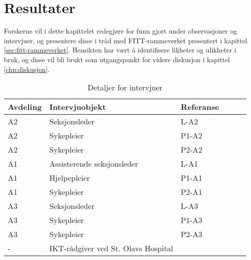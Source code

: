 \chapter{Resultater}
\label{chp:resultater} 

Forskerne vil i dette kapittelet redegjøre for funn gjort under observasjoner og intervjuer, og presentere disse i tråd med FITT-rammeverket presentert i kapittel \ref{sec:fitt-rammeverket}. Hensikten har vært å identifisere likheter og ulikheter i bruk, og disse vil bli brukt som utgangspunkt for videre diskusjon i kapittel \ref{chp:diskusjon}.


\begin{table}[H]\centering
    \begin{tabular}{ |l|l|l|l|l|l| }
    \hline
    Avdeling & Intervjuobjekt & Referanse \\ \hline
       A2 & Seksjonsleder & L-A2 \\ \hline
       A2 & Sykepleier & P1-A2 \\ \hline
       A2 & Sykepleier & P2-A2 \\ \hline
       A1 & Assisterende seksjonsleder & L-A1 \\ \hline
       A1 & Hjelpepleier & P1-A1 \\ \hline
       A1 & Sykepleier & P2-A1 \\ \hline
       A3 & Seksjonsleder & L-A3 \\ \hline
       A3 & Sykepleier & P1-A3 \\ \hline
       A3 & Sykepleier & P2-A3 \\ \hline
       - & IKT-rådgiver ved St. Olavs Hospital &  \\ \hline
    \end{tabular}
    \caption {Detaljer for intervjuer}
    \label{detaljerintervju}
\end{table}


